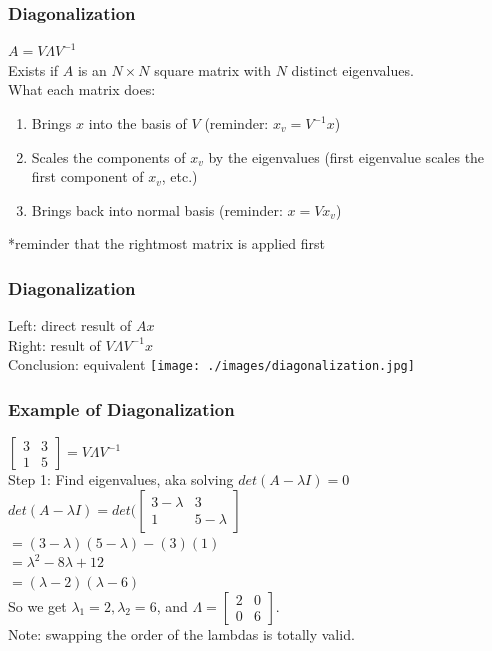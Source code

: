 \documentclass{beamer}
\begin{document}
\begin{frame}
\frametitle{Diagonalization}
{\huge  $A = V\Lambda V^{-1}$} \\
\vspace{20pt}
Exists if $A$ is an $N\times N$ square matrix with $N$ distinct eigenvalues. \\
What each matrix does:
\begin{enumerate}
\item Brings $x$ into the basis of $V$ (reminder: $x_v = V^{-1}x$)
\item Scales the components of $x_v$ by the eigenvalues (first eigenvalue scales the first component of $x_v$, etc.)
\item Brings back into normal basis (reminder: $x = Vx_v$)
\end{enumerate}
*reminder that the rightmost matrix is applied first
\end{frame}


\begin{frame}
\frametitle{Diagonalization}
Left: direct result of $Ax$ \\
Right: result of $V\Lambda V^{-1}x$ \\
Conclusion: equivalent
\texttt{[image: ./images/diagonalization.jpg]}

\end{frame}

\begin{frame}
\frametitle{Example of Diagonalization}
{\huge $\begin{bmatrix} 3 & 3 \\ 1 & 5 \end{bmatrix} = V\Lambda V^{-1}$}
\\
\vspace{20pt}
Step 1: Find eigenvalues, aka solving $det(A-\lambda I) = 0$ \\
$det(A-\lambda I) = det(\begin{bmatrix} 3-\lambda & 3 \\ 1 & 5-\lambda \end{bmatrix}$ \\
$ = (3-\lambda)(5-\lambda)-(3)(1)$ \\
$ = \lambda^2 - 8\lambda + 12$ \\
$ = (\lambda - 2)(\lambda - 6)$ \\
So we get $\lambda_1 = 2, \lambda_2 = 6$, and $\Lambda = \begin{bmatrix}2 & 0 \\ 0 & 6\end{bmatrix}$. \\
Note: swapping the order of the lambdas is totally valid.

\end{frame}
\end{document}
